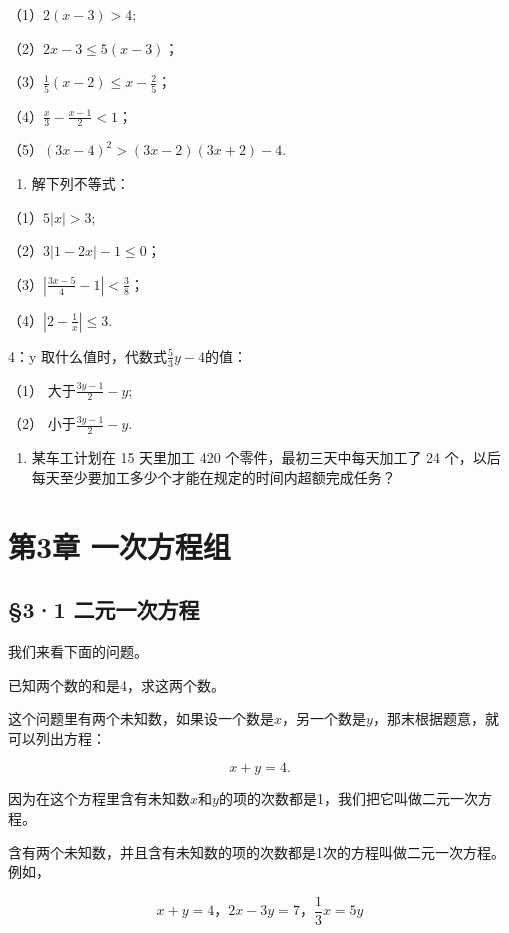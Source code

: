 （1）\(2(x-3)>4;\)

（2）\(2x - 3 \leqslant 5(x - 3)\)；

（3）\(\frac{1}{5} (x - 2) \leqslant x - \frac{2}{5}\)；

（4）\(\frac{x}{3} - \frac{x - 1}{2} < 1\)；

（5）\((3x - 4)^{2} > (3x - 2)(3x + 2) - 4.\)

\begin{enumerate}[start=3]
\item
  解下列不等式：
\end{enumerate}

（1）\(5|x| > 3;\)

（2）\(3|1 - 2x| - 1 \leqslant 0\)；

（3）\(\left|\frac{3x - 5}{4} - 1\right| < \frac{3}{8}\)；

（4）\(\left|2 - \frac{1}{x}\right| \leqslant 3.\)

4：y 取什么值时，代数式\(\frac{5}{3}y-4\)的值：

（1） 大于\(\frac{3y-1}{2}-y;\)

（2） 小于\(\frac{3y-1}{2}-y.\)

\begin{enumerate}[start=5]
\item
  某车工计划在 15 天里加工 420 个零件，最初三天中每天加工了 24
  个，以后每天至少要加工多少个才能在规定的时间内超额完成任务？
\end{enumerate}

\chapter{第3章 一次方程组}

\section{§3·1 二元一次方程}

我们来看下面的问题。

已知两个数的和是4，求这两个数。

这个问题里有两个未知数，如果设一个数是\(x\)，另一个数是\(y\)，那末根据题意，就可以列出方程：

\[
x + y = 4.
\]

因为在这个方程里含有未知数\(x\)和\(y\)的项的次数都是1，我们把它叫做二元一次方程。

含有两个未知数，并且含有未知数的项的次数都是1次的方程叫做二元一次方程。例如，

\[
x + y = 4\text{，} 2 x - 3 y = 7\text{，} \frac{1}{3} x = 5 y
\]

